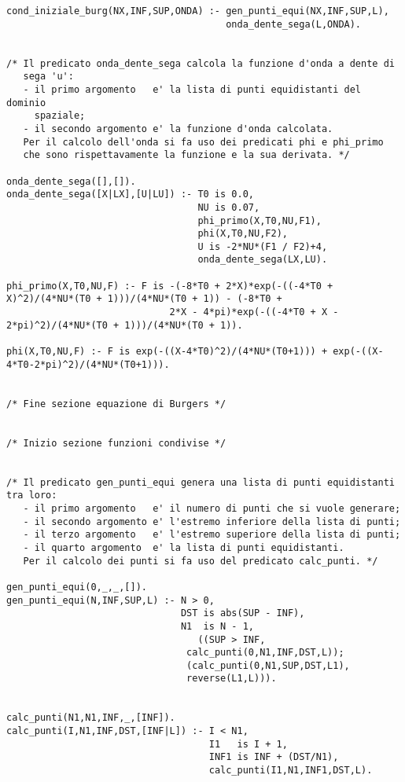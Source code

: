\begin{verbatim}
cond_iniziale_burg(NX,INF,SUP,ONDA) :- gen_punti_equi(NX,INF,SUP,L),
                                       onda_dente_sega(L,ONDA).


/* Il predicato onda_dente_sega calcola la funzione d'onda a dente di 
   sega 'u':
   - il primo argomento   e' la lista di punti equidistanti del dominio
     spaziale;
   - il secondo argomento e' la funzione d'onda calcolata. 
   Per il calcolo dell'onda si fa uso dei predicati phi e phi_primo
   che sono rispettavamente la funzione e la sua derivata. */

onda_dente_sega([],[]).
onda_dente_sega([X|LX],[U|LU]) :- T0 is 0.0,
                                  NU is 0.07,
                                  phi_primo(X,T0,NU,F1),
                                  phi(X,T0,NU,F2),
                                  U is -2*NU*(F1 / F2)+4,
                                  onda_dente_sega(LX,LU).

phi_primo(X,T0,NU,F) :- F is -(-8*T0 + 2*X)*exp(-((-4*T0 + X)^2)/(4*NU*(T0 + 1)))/(4*NU*(T0 + 1)) - (-8*T0 +
                             2*X - 4*pi)*exp(-((-4*T0 + X - 2*pi)^2)/(4*NU*(T0 + 1)))/(4*NU*(T0 + 1)).

phi(X,T0,NU,F) :- F is exp(-((X-4*T0)^2)/(4*NU*(T0+1))) + exp(-((X-4*T0-2*pi)^2)/(4*NU*(T0+1))).


/* Fine sezione equazione di Burgers */


/* Inizio sezione funzioni condivise */


/* Il predicato gen_punti_equi genera una lista di punti equidistanti tra loro:
   - il primo argomento   e' il numero di punti che si vuole generare;
   - il secondo argomento e' l'estremo inferiore della lista di punti;
   - il terzo argomento   e' l'estremo superiore della lista di punti;
   - il quarto argomento  e' la lista di punti equidistanti. 
   Per il calcolo dei punti si fa uso del predicato calc_punti. */

gen_punti_equi(0,_,_,[]).
gen_punti_equi(N,INF,SUP,L) :- N > 0,
                               DST is abs(SUP - INF),
                               N1  is N - 1, 
			                      ((SUP > INF,
                                calc_punti(0,N1,INF,DST,L));
                                (calc_punti(0,N1,SUP,DST,L1),
                                reverse(L1,L))).


calc_punti(N1,N1,INF,_,[INF]).
calc_punti(I,N1,INF,DST,[INF|L]) :- I < N1,
                                    I1   is I + 1,
                                    INF1 is INF + (DST/N1),
                                    calc_punti(I1,N1,INF1,DST,L).


\end{verbatim}
